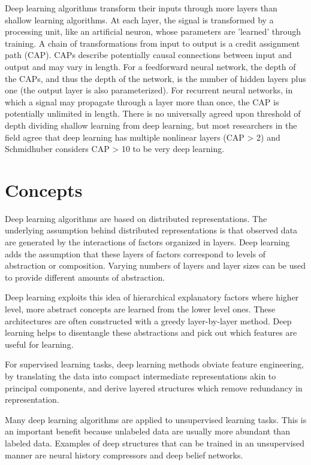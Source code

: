\documentclass{article}
\begin{document}
Deep learning algorithms transform their inputs through more layers than shallow learning algorithms. At each layer, the signal is transformed by a processing unit, like an artificial neuron, whose parameters are 'learned' through training. A chain of transformations from input to output is a credit assignment path (CAP). CAPs describe potentially causal connections between input and output and may vary in length. For a feedforward neural network, the depth of the CAPs, and thus the depth of the network, is the number of hidden layers plus one (the output layer is also parameterized). For recurrent neural networks, in which a signal may propagate through a layer more than once, the CAP is potentially unlimited in length. There is no universally agreed upon threshold of depth dividing shallow learning from deep learning, but most researchers in the field agree that deep learning has multiple nonlinear layers (CAP > 2) and Schmidhuber considers CAP > 10 to be very deep learning.


\section{Concepts}

Deep learning algorithms are based on distributed representations. The underlying assumption behind distributed representations is that observed data are generated by the interactions of factors organized in layers. Deep learning adds the assumption that these layers of factors correspond to levels of abstraction or composition. Varying numbers of layers and layer sizes can be used to provide different amounts of abstraction.

Deep learning exploits this idea of hierarchical explanatory factors where higher level, more abstract concepts are learned from the lower level ones. These architectures are often constructed with a greedy layer-by-layer method. Deep learning helps to disentangle these abstractions and pick out which features are useful for learning.

For supervised learning tasks, deep learning methods obviate feature engineering, by translating the data into compact intermediate representations akin to principal components, and derive layered structures which remove redundancy in representation.

Many deep learning algorithms are applied to unsupervised learning tasks. This is an important benefit because unlabeled data are usually more abundant than labeled data. Examples of deep structures that can be trained in an unsupervised manner are neural history compressors and deep belief networks.
\end{document}
